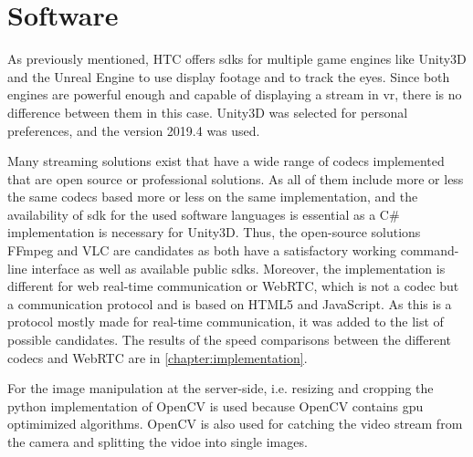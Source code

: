 \section{Software}\label{section:software}
As previously mentioned, HTC offers \glspl{sdk} for multiple game engines like Unity3D \parencite{Unity2020} and the Unreal Engine \parencite{Unreal2020} to use display footage and to track the eyes. Since both engines are powerful enough and capable of displaying a stream in \gls{vr}, there is no difference between them in this case. Unity3D was selected for personal preferences, and the version 2019.4 was used.
\par
Many streaming solutions exist that have a wide range of codecs implemented that are open source or professional solutions. As all of them include more or less the same codecs based more or less on the same implementation, and the availability of \gls{sdk} for the used software languages is essential as a C\# implementation is necessary for Unity3D. Thus, the open-source solutions FFmpeg and VLC are candidates as both have a satisfactory working command-line interface as well as available public \glspl{sdk}. Moreover, the implementation is different for web real-time communication or WebRTC, which is not a codec but a communication protocol and is based on HTML5 and JavaScript. As this is a protocol mostly made for real-time communication, it was added to the list of possible candidates. The results of the speed comparisons between the different codecs and WebRTC are in \autoref{chapter:implementation}.
\par
For the image manipulation at the server-side, i.e. resizing and cropping the python implementation of OpenCV is used because OpenCV contains \gls{gpu} optimimized algorithms. OpenCV is also used for catching the video stream from the camera and splitting the vidoe into single images.
